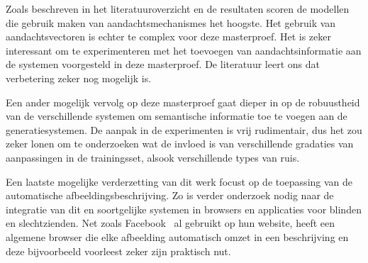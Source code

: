 Zoals beschreven in het literatuuroverzicht en de resultaten scoren de modellen die gebruik maken van aandachtsmechanismes het hoogste. Het gebruik van aandachtsvectoren is echter te complex voor deze masterproef. Het is zeker interessant om te experimenteren met het toevoegen van aandachtsinformatie aan de systemen voorgesteld in deze masterproef. De literatuur leert ons dat verbetering zeker nog mogelijk is. 

Een ander mogelijk vervolg op deze masterproef gaat dieper in op de robuustheid van de verschillende systemen om semantische informatie toe te voegen aan de generatiesystemen.
De aanpak in de experimenten is vrij rudimentair, dus het zou zeker lonen om te onderzoeken wat de invloed is van verschillende gradaties van aanpassingen in de trainingsset, alsook verschillende types van ruis.

Een laatste mogelijke verderzetting van dit werk focust op de toepassing van de automatische afbeeldingsbeschrijving. 
Zo is verder onderzoek nodig naar de integratie van dit en soortgelijke systemen in browsers en applicaties voor blinden en slechtzienden. Net zoals Facebook~\cite{facebook} al gebruikt op hun website, heeft een algemene browser die elke afbeelding automatisch omzet in een beschrijving en deze bijvoorbeeld voorleest zeker zijn praktisch nut.

